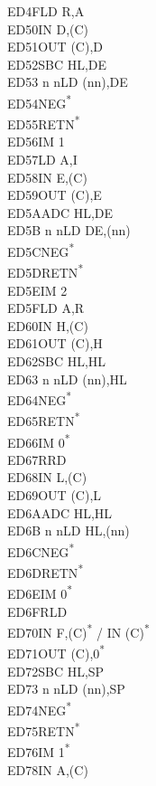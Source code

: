 \documentclass[twoside,openright,a4paper]{book}
\begin{document}
\begin{multicols}{3}
{\begin{tabbing}
	ED4F\>LD R,A\\
	ED50\>IN D,(C)\\
	ED51\>OUT (C),D\\
	ED52\>SBC HL,DE\\
	ED53 n n\>LD (nn),DE\\
	ED54\>NEG\textsuperscript{*}\\
	ED55\>RETN\textsuperscript{*}\\
	ED56\>IM 1\\
	ED57\>LD A,I\\
	ED58\>IN E,(C)\\
	ED59\>OUT (C),E\\
	ED5A\>ADC HL,DE\\
	ED5B n n\>LD DE,(nn)\\
	ED5C\>NEG\textsuperscript{*}\\
	ED5D\>RETN\textsuperscript{*}\\
	ED5E\>IM 2\\
	ED5F\>LD A,R\\
	ED60\>IN H,(C)\\
	ED61\>OUT (C),H\\
	ED62\>SBC HL,HL\\
	ED63 n n\>LD (nn),HL\\
	ED64\>NEG\textsuperscript{*}\\
	ED65\>RETN\textsuperscript{*}\\
	ED66\>IM 0\textsuperscript{*}\\
	ED67\>RRD\\
	ED68\>IN L,(C)\\
	ED69\>OUT (C),L\\
	ED6A\>ADC HL,HL\\
	ED6B n n\>LD HL,(nn)\\
	ED6C\>NEG\textsuperscript{*}\\
	ED6D\>RETN\textsuperscript{*}\\
	ED6E\>IM 0\textsuperscript{*}\\
	ED6F\>RLD\\
	ED70\>IN F,(C)\textsuperscript{*} / IN (C)\textsuperscript{*}\\
	ED71\>OUT (C),0\textsuperscript{*}\\
	ED72\>SBC HL,SP\\
	ED73 n n\>LD (nn),SP\\
	ED74\>NEG\textsuperscript{*}\\
	ED75\>RETN\textsuperscript{*}\\
	ED76\>IM 1\textsuperscript{*}\\
	ED78\>IN A,(C)\\

\end{tabbing}}
\end{multicols}
\end{document}
